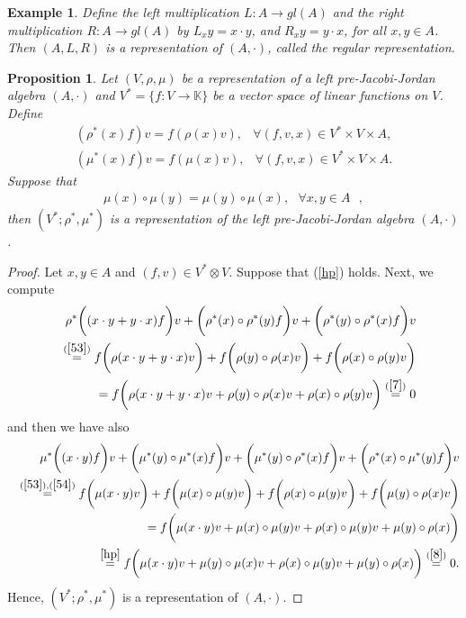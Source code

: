 \documentclass[12pt]{amsart}
\newtheorem{example}[Theorem]{Example}
\newtheorem{proposition}[Theorem]{Proposition}
\begin{document}
	\begin{example}
		Define the left multiplication $ L : A\to gl(A) $ and the right multiplication $ R : A\to gl(A)  $ by
		$ L_{x}y=x\cdot y $, and $ R_{x}y=y\cdot x $, for all $ x,y\in A $. Then $ (A,L,R) $ is a representation of $ (A, \cdot) $, called the regular representation.
	\end{example}
	\begin{proposition}\label{Pro13}
		Let $ (V,\rho,\mu) $ be a representation of a left pre-Jacobi-Jordan algebra $ (A, \cdot) $ and $ V^{*}=\{f : V\to \mathbb{K}\} $ be a vector space of linear functions on $ V $. Define
		\begin{eqnarray}
			\label{53}
			(\rho^{*}(x)f)v=f(\rho(x)v),  
			& \forall (f,v,x)\in V^{*}\times V\times A,
		\end{eqnarray}
		\begin{eqnarray}
			\label{54}
			(\mu^{*}(x)f)v=f(\mu(x)v),& \forall (f,v,x)\in V^{*}\times V\times A.  
		\end{eqnarray}
		Suppose that 
		\begin{eqnarray}
			\mu(x)\circ \mu(y)=\mu(y)\circ \mu(x),  \mbox{ $\forall  x,y\in A$ },\label{hp}
		\end{eqnarray}
		then $ (V^{*};\rho^{*},\mu^{*}) $  is  a representation of the left pre-Jacobi-Jordan algebra $ (A, \cdot) $.
	\end{proposition}
	\begin{proof} Let $ x,y \in A$ and $ (f,v)\in V^{*}\otimes V $. Suppose that (\ref{hp}) holds.  Next, we compute
		\begin{eqnarray}
			&&\rho^{*}\bigg((x\cdot y+y\cdot x)f\bigg)v+\bigg(\rho^{*}(x)\circ\rho^{*}(y)f\bigg)v+\bigg(\rho^{*}(y)\circ\rho^{*}(x)f\bigg)v
			\nonumber\\
			&&\overset{(\ref{53})}{=}f\bigg(\rho(x\cdot y+y\cdot x)v\bigg)
			+f\bigg(\rho(y)\circ\rho(x)v\bigg)+f\bigg(\rho(x)\circ\rho(y)v\bigg)\nonumber\\
			&&=f\bigg(\rho(x\cdot y+y\cdot x)v+\rho(y)\circ\rho(x)v+\rho(x)\circ\rho(y)v\bigg)\overset{(\ref{7})}{=}0\nonumber
		\end{eqnarray} 
		and then we have also 
		\begin{eqnarray}
			&&\mu^{*}\bigg((x\cdot y)f\bigg)v+\bigg(\mu^{*}(y)\circ\mu^{*}(x)f\bigg)v+\bigg(\mu^{*}(y)\circ\rho^{*}(x)f\bigg)v+\bigg(\rho^{*}(x)\circ\mu^{*}(y)f\bigg)v\nonumber\\
			&&\overset{(\ref{53}),(\ref{54})}{=}f\bigg(\mu(x\cdot y)v\bigg)
			+f\bigg(\mu(x)\circ\mu(y)v\bigg)+f\bigg(\rho(x)\circ\mu(y)v\bigg)+f\bigg(\mu(y)\circ\rho(x)v\bigg)\nonumber\\
			&&=f\bigg(\mu(x\cdot y)v+\mu(x)\circ\mu(y)v
			+\rho(x)\circ\mu(y)v+\mu(y)\circ\rho(x)\bigg)\nonumber\\
			&&\overset{\ref{hp}}{=}f\bigg(\mu(x\cdot y)v+\mu(y)\circ\mu(x)v
			+\rho(x)\circ\mu(y)v+\mu(y)\circ\rho(x)\bigg)\overset{(\ref{8})}{=}0.\nonumber
		\end{eqnarray}
		Hence, $ (V^{*};\rho^{*},\mu^{*}) $  is  a representation of $ (A, \cdot) $.	
	\end{proof}
\end{document}
